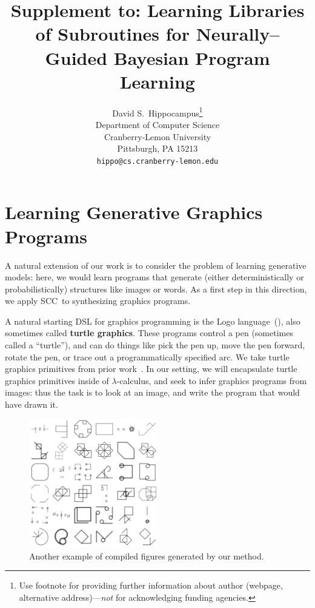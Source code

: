\documentclass{article}
\title{Supplement to: Learning Libraries of Subroutines for Neurally--Guided Bayesian Program Learning}
\author{
  David S.~Hippocampus\thanks{Use footnote for providing further
    information about author (webpage, alternative
    address)---\emph{not} for acknowledging funding agencies.} \\
  Department of Computer Science\\
  Cranberry-Lemon University\\
  Pittsburgh, PA 15213 \\
  \texttt{hippo@cs.cranberry-lemon.edu} \\
}
\newcommand{\system}{\textsc{SCC}~}
\begin{document}

\maketitle

\section{Learning Generative Graphics Programs}

A natural extension of our work is to consider the problem of learning generative models:
here, we would learn programs that generate (either deterministically or probabilistically)
structures like images or words.
As a first step in this direction,
we apply \system to synthesizing graphics programs.

A natural starting DSL for graphics programming is the
Logo language~(\cite{abelson1974logo}), also sometimes called \textbf{turtle graphics}.
These programs control a pen (sometimes called a ``turtle''),
and can do things like pick the pen up,
move the pen forward,
rotate the pen,
or trace out a programmatically specified arc.
We take turtle graphics primitives from prior work~\cite{sablemeyer2017geom}.
In our setting, we will encapsulate turtle graphics primitives inside of $\lambda$-calculus,
and seek to infer graphics programs from images: thus the task is to look at an image,
and write the program that would have drawn it.

\begin{figure}[htp]
  \begin{center}
  \includegraphics[width = 0.5\textwidth]{figures/moreDreams.png}
  \end{center}
\caption{Another example of compiled figures generated by our method.}\label{moreDreams}
\end{figure}
\end{document}
